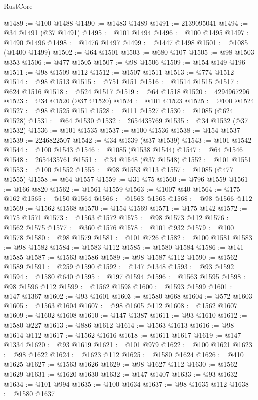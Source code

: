 \begin{lexlean}{RustCore}
\begin{coremodule}
@1489 := @100 @1488
@1490 := @1483 @1489
@1491 := 2139095041
@1494 := @34 @1491 (@37 @1491)
@1495 := @101 @1494
@1496 := @100 @1495
@1497 := @1490 @1496
@1498 := @1476 @1497
@1499 := @1447 @1498
@1501 := @1085 (@1400 @1499)
@1502 := @64 @1501
@1503 := @680 @107
@1505 := @98 @1503 @353
@1506 := @477 @1505
@1507 := @98 @1506
@1509 := @154 @149 @196
@1511 := @98 @1509 @112
@1512 := @1507 @1511
@1513 := @774 @1512
@1514 := @98 @1513
@1515 := @751 @151
@1516 := @1514 @1515
@1517 := @624 @1516
@1518 := @524 @1517
@1519 := @64 @1518
@1520 := 4294967296
@1523 := @34 @1520 (@37 @1520)
@1524 := @101 @1523
@1525 := @100 @1524
@1527 := @98 @1525 @151
@1528 := @111 @1527
@1530 := @1085 (@624 @1528)
@1531 := @64 @1530
@1532 := 2654435769
@1535 := @34 @1532 (@37 @1532)
@1536 := @101 @1535
@1537 := @100 @1536
@1538 := @154 @1537
@1539 := 2246822507
@1542 := @34 @1539 (@37 @1539)
@1543 := @101 @1542
@1544 := @100 @1543
@1546 := @1085 (@1538 @1544)
@1547 := @64 @1546
@1548 := 2654435761
@1551 := @34 @1548 (@37 @1548)
@1552 := @101 @1551
@1553 := @100 @1552
@1555 := @98 @1553 @113
@1557 := @1085 (@477 @1555)
@1558 := @64 @1557
@1559 := @31 @75
@1560 := @796 @1559
@1561 := @166 @820
@1562 := @1561 @1559
@1563 := @1007 @40
@1564 := @175 @162
@1565 := @150 @1564
@1566 := @1563 @1565
@1568 := @98 @1566 @112
@1569 := @1562 @1568
@1570 := @154 @1569
@1571 := @175 @142
@1572 := @175 @1571
@1573 := @1563 @1572
@1575 := @98 @1573 @112
@1576 := @1562 @1575
@1577 := @360 @1576
@1578 := @101 @932
@1579 := @100 @1578
@1580 := @98 @1579
@1581 := @101 @726
@1582 := @100 @1581
@1583 := @98 @1582
@1584 := @1583 @112
@1585 := @1580 @1584
@1586 := @141 @1585
@1587 := @1563 @1586
@1589 := @98 @1587 @112
@1590 := @1562 @1589
@1591 := @259 @1590
@1592 := @147 @1348
@1593 := @93 @1592
@1594 := @1580 @640
@1595 := @197 @1594
@1596 := @1563 @1595
@1598 := @98 @1596 @112
@1599 := @1562 @1598
@1600 := @1593 @1599
@1601 := @147 @1367
@1602 := @93 @1601
@1603 := @1580 @668
@1604 := @572 @1603
@1605 := @1563 @1604
@1607 := @98 @1605 @112
@1608 := @1562 @1607
@1609 := @1602 @1608
@1610 := @147 @1387
@1611 := @93 @1610
@1612 := @1580 @227
@1613 := @886 @1612
@1614 := @1563 @1613
@1616 := @98 @1614 @112
@1617 := @1562 @1616
@1618 := @1611 @1617
@1619 := @147 @1334
@1620 := @93 @1619
@1621 := @101 @979
@1622 := @100 @1621
@1623 := @98 @1622
@1624 := @1623 @112
@1625 := @1580 @1624
@1626 := @410 @1625
@1627 := @1563 @1626
@1629 := @98 @1627 @112
@1630 := @1562 @1629
@1631 := @1620 @1630
@1632 := @147 @1407
@1633 := @93 @1632
@1634 := @101 @994
@1635 := @100 @1634
@1637 := @98 @1635 @112
@1638 := @1580 @1637

\end{coremodule}
\end{lexlean}
